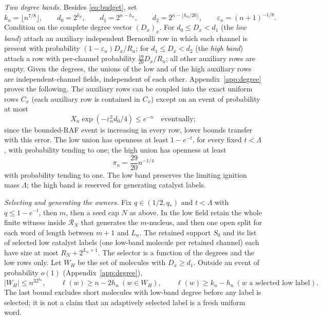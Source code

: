 \documentclass[11pt,letterpaper]{article}
\theoremstyle{plain}
\theoremstyle{definition}
\theoremstyle{remark}
\numberwithin{equation}{section}
\newcommand{\RR}{\mathcal R}
\newcommand{\eps}{\varepsilon}
\begin{document}
\emph{Two degree bands.} Besides \eqref{eq:budget}, set
\begin{equation}\label{eq:bands}
 k_n=\lfloor n^{7/8}\rfloor,\qquad d_0=2^{k_n},\qquad d_1=2^{n-h_n},\qquad d_2=2^{n-\lfloor h_n/20\rfloor},\qquad \eps_n=(n+1)^{-1/8}.
\end{equation}
Condition on the complete degree vector $(D_x)_x$. For $d_0\le D_x<d_1$ (the \emph{low band}) attach an auxiliary independent Bernoulli row in which each channel is present with probability $(1-\eps_n)D_x/R_n$; for $d_1\le D_x<d_2$ (the \emph{high band}) attach a row with per-channel probability $\frac{19}{20}D_x/R_n$; all other auxiliary rows are empty. Given the degrees, the unions of the low and of the high auxiliary rows are independent-channel fields, independent of each other. Appendix~\ref{app:degree} proves the following. The auxiliary rows can be coupled into the exact uniform rows $C_x$ (each auxiliary row is contained in $C_x$) except on an event of probability at most
\begin{equation}\label{eq:overflow}
 X_n\exp(-\eps_n^2d_0/4)\le e^{-n}\quad\text{eventually};
\end{equation}
since the bounded-RAF event is increasing in every row, lower bounds transfer with this error. The low union has openness at least $1-e^{-t}$, for every fixed $t<\Lambda$, with probability tending to one; the high union has openness at least
\begin{equation}\label{eq:highfloor}
 \pi_n=\frac{29}{20}n^{-1/4}
\end{equation}
with probability tending to one. The low band preserves the limiting ignition mass $\Lambda$; the high band is reserved for generating catalyst labels.

\emph{Selecting and generating the owners.} Fix $q\in(1/2,q_*)$ and $t<\Lambda$ with $q\le1-e^{-t}$, then $m$, then a seed cap $N$ as above. In the low field retain the whole finite witness inside $\RR_N$ that generates the $m$-nucleus, and then one open split for each word of length between $m+1$ and $L_n$. The retained support $S_0$ and its list of selected low catalyst labels (one low-band molecule per retained channel) each have size at most $R_N+2^{L_n+1}$. The selector is a function of the degrees and the low rows only. Let $W_H$ be the set of molecules with $D_x\ge d_1$. Outside an event of probability $o(1)$ (Appendix~\ref{app:degree}),
\begin{equation}\label{eq:owners}
 |W_H|\le n^32^{h_n},\qquad \ell(w)\ge n-2h_n\ (w\in W_H),\qquad \ell(w)\ge k_n-h_n\ (w\text{ a selected low label}).
\end{equation}
The last bound excludes short molecules with low-band degree before any label is selected; it is not a claim that an adaptively selected label is a fresh uniform word.
\end{document}
